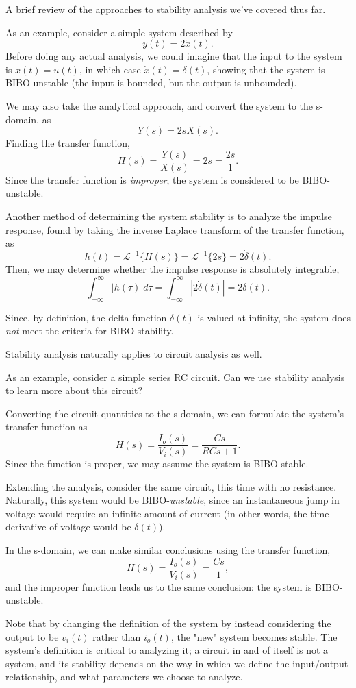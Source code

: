 \documentclass{article}
\begin{document}
A brief review of the approaches to stability analysis we've covered thus far. 

As an example, consider a simple system described by
\[
	y(t) = 2\dot{x}(t).
\]
Before doing any actual analysis, we could imagine that the input to the system is \(x(t) = u(t)\), in which case \(\dot{x}(t) = \delta(t)\), showing that the system is BIBO-unstable (the input is bounded, but the output is unbounded).

We may also take the analytical approach, and convert the system to the s-domain, as
\[
  Y(s) = 2sX(s).
\]
Finding the transfer function,
\[
  H(s) = \frac{Y(s)}{X(s)} = 2s = \frac{2s}{1}.
\]
Since the transfer function is \textit{improper}, the system is considered to be BIBO-unstable.

Another method of determining the system stability is to analyze the impulse response, found by taking the inverse Laplace transform of the transfer function, as
\[
	h(t) = \mathcal{L}^{-1}\{H(s)\} = \mathcal{L}^{-1}\{2s\} = 2\dot{\delta}(t).
\]
Then, we may determine whether the impulse response is absolutely integrable,
\[
	\int_{-\infty}^{\infty} |h(\tau)| d \tau = \int_{-\infty}^{\infty}|2\dot{\delta}(t)| = 2\delta(t).
\]

Since, by definition, the delta function \(\delta(t)\) is valued at infinity, the system does \textit{not} meet the criteria for BIBO-stability.

Stability analysis naturally applies to circuit analysis as well.

As an example, consider a simple series RC circuit. Can we use stability analysis to learn more about this circuit? 

Converting the circuit quantities to the s-domain, we can formulate the system's transfer function as
\[
  H(s) = \frac{I_o(s)}{V_i(s)} = \frac{Cs}{RCs+1}.
\]
Since the function is proper, we may assume the system is BIBO-stable.

Extending the analysis, consider the same circuit, this time with no resistance. Naturally, this system would be BIBO-\textit{unstable}, since an instantaneous jump in voltage would require an infinite amount of current (in other words, the time derivative of voltage would be \(\delta(t)\)).

In the s-domain, we can make similar conclusions using the transfer function,
\[
  H(s) = \frac{I_o(s)}{V_i(s)} = \frac{Cs}{1},
\]
and the improper function leads us to the same conclusion: the system is BIBO-unstable.

Note that by changing the definition of the system by instead considering the output to be \(v_i(t)\) rather than \(i_o(t)\), the "new" system becomes stable. The system's definition is critical to analyzing it; a circuit in and of itself is not a system, and its stability depends on the way in which we define the input/output relationship, and what parameters we choose to analyze. 
\end{document}
